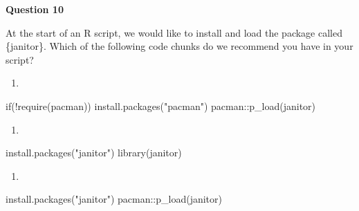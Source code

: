 \documentclass[
  letterpaper,
  DIV=11,
  numbers=noendperiod]{scrreprt}
\newenvironment{Shaded}{\begin{snugshade}}{\end{snugshade}}
\newcommand{\ControlFlowTok}[1]{\textcolor[rgb]{0.00,0.23,0.31}{#1}}
\newcommand{\FunctionTok}[1]{\textcolor[rgb]{0.28,0.35,0.67}{#1}}
\newcommand{\NormalTok}[1]{\textcolor[rgb]{0.00,0.23,0.31}{#1}}
\newcommand{\SpecialCharTok}[1]{\textcolor[rgb]{0.37,0.37,0.37}{#1}}
\newcommand{\StringTok}[1]{\textcolor[rgb]{0.13,0.47,0.30}{#1}}
\providecommand{\tightlist}{%
  \setlength{\itemsep}{0pt}\setlength{\parskip}{0pt}}\usepackage{longtable,booktabs,array}
\begin{document}
\begin{tcolorbox}[enhanced jigsaw, colframe=quarto-callout-tip-color-frame, rightrule=.15mm, opacityback=0, breakable, coltitle=black, colbacktitle=quarto-callout-tip-color!10!white, bottomrule=.15mm, leftrule=.75mm, toprule=.15mm, arc=.35mm, bottomtitle=1mm, colback=white, left=2mm, opacitybacktitle=0.6, titlerule=0mm, title=\textcolor{quarto-callout-tip-color}{\faLightbulb}\hspace{0.5em}{Practice}, toptitle=1mm]

\textbf{Question 10}

At the start of an R script, we would like to install and load the
package called \{janitor\}. Which of the following code chunks do we
recommend you have in your script?

\begin{enumerate}
\def\labelenumi{\Alph{enumi}.}
\tightlist
\item
\end{enumerate}

\begin{Shaded}
\begin{Highlighting}[]
\ControlFlowTok{if}\NormalTok{(}\SpecialCharTok{!}\FunctionTok{require}\NormalTok{(pacman)) }\FunctionTok{install.packages}\NormalTok{(}\StringTok{"pacman"}\NormalTok{)}
\NormalTok{pacman}\SpecialCharTok{::}\FunctionTok{p\_load}\NormalTok{(janitor)}
\end{Highlighting}
\end{Shaded}

\begin{enumerate}
\def\labelenumi{\Alph{enumi}.}
\setcounter{enumi}{1}
\tightlist
\item
\end{enumerate}

\begin{Shaded}
\begin{Highlighting}[]
\FunctionTok{install.packages}\NormalTok{(}\StringTok{"janitor"}\NormalTok{)}
\FunctionTok{library}\NormalTok{(janitor)}
\end{Highlighting}
\end{Shaded}

\begin{enumerate}
\def\labelenumi{\Alph{enumi}.}
\setcounter{enumi}{2}
\tightlist
\item
\end{enumerate}

\begin{Shaded}
\begin{Highlighting}[]
\FunctionTok{install.packages}\NormalTok{(}\StringTok{"janitor"}\NormalTok{)}
\NormalTok{pacman}\SpecialCharTok{::}\FunctionTok{p\_load}\NormalTok{(janitor)}
\end{Highlighting}
\end{Shaded}

\end{tcolorbox}
\end{document}
